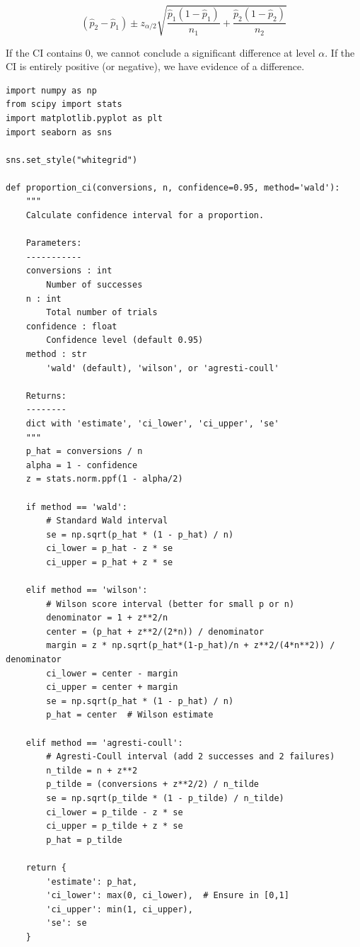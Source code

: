 \begin{equation}
(\hat{p}_2 - \hat{p}_1) \pm z_{\alpha/2} \sqrt{\frac{\hat{p}_1(1-\hat{p}_1)}{n_1} + \frac{\hat{p}_2(1-\hat{p}_2)}{n_2}}
\end{equation}

If the CI contains 0, we cannot conclude a significant difference at level $\alpha$.
If the CI is entirely positive (or negative), we have evidence of a difference.

\lstset{language=Python, caption=Computing Confidence Intervals, label=lst:confidence_intervals}
\begin{lstlisting}
import numpy as np
from scipy import stats
import matplotlib.pyplot as plt
import seaborn as sns

sns.set_style("whitegrid")

def proportion_ci(conversions, n, confidence=0.95, method='wald'):
    """
    Calculate confidence interval for a proportion.

    Parameters:
    -----------
    conversions : int
        Number of successes
    n : int
        Total number of trials
    confidence : float
        Confidence level (default 0.95)
    method : str
        'wald' (default), 'wilson', or 'agresti-coull'

    Returns:
    --------
    dict with 'estimate', 'ci_lower', 'ci_upper', 'se'
    """
    p_hat = conversions / n
    alpha = 1 - confidence
    z = stats.norm.ppf(1 - alpha/2)

    if method == 'wald':
        # Standard Wald interval
        se = np.sqrt(p_hat * (1 - p_hat) / n)
        ci_lower = p_hat - z * se
        ci_upper = p_hat + z * se

    elif method == 'wilson':
        # Wilson score interval (better for small p or n)
        denominator = 1 + z**2/n
        center = (p_hat + z**2/(2*n)) / denominator
        margin = z * np.sqrt(p_hat*(1-p_hat)/n + z**2/(4*n**2)) / denominator
        ci_lower = center - margin
        ci_upper = center + margin
        se = np.sqrt(p_hat * (1 - p_hat) / n)
        p_hat = center  # Wilson estimate

    elif method == 'agresti-coull':
        # Agresti-Coull interval (add 2 successes and 2 failures)
        n_tilde = n + z**2
        p_tilde = (conversions + z**2/2) / n_tilde
        se = np.sqrt(p_tilde * (1 - p_tilde) / n_tilde)
        ci_lower = p_tilde - z * se
        ci_upper = p_tilde + z * se
        p_hat = p_tilde

    return {
        'estimate': p_hat,
        'ci_lower': max(0, ci_lower),  # Ensure in [0,1]
        'ci_upper': min(1, ci_upper),
        'se': se
    }



\end{lstlisting}
